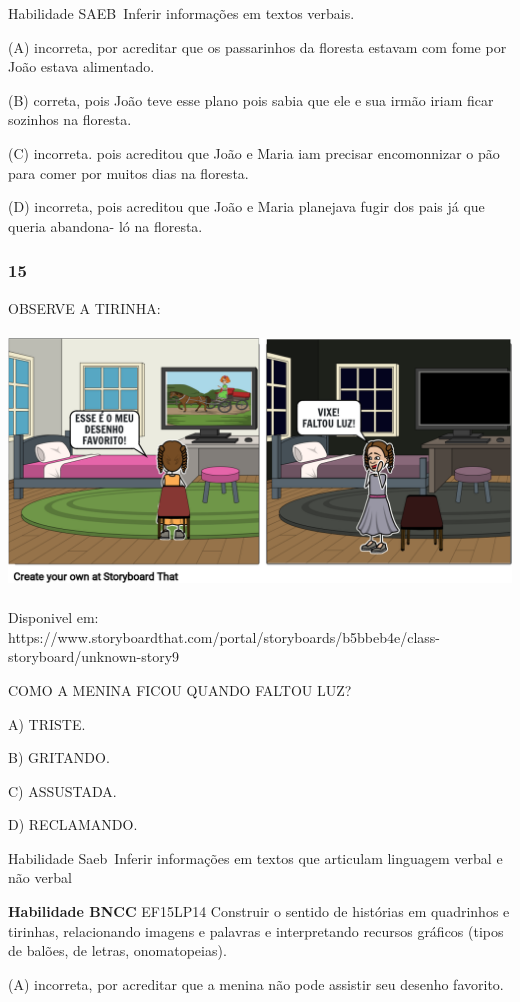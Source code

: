 \begin{escola}
Habilidade SAEB~Inferir informações em textos verbais.

(A) incorreta, por acreditar que os passarinhos da floresta estavam com
fome por João estava alimentado.

(B) correta, pois João teve esse plano pois sabia que ele e sua irmão
iriam ficar sozinhos na floresta.

(C) incorreta. pois acreditou que João e Maria iam precisar encomonnizar
o pão para comer por muitos dias na floresta.

(D) incorreta, pois acreditou que João e Maria planejava fugir dos pais
já que queria abandona- ló na floresta.

\subsubsection{15}\label{section-40}

OBSERVE A TIRINHA:

\includegraphics[width=5.42742in,height=2.68116in]{media/image206.png}

Disponivel em:
https://www.storyboardthat.com/portal/storyboards/b5bbeb4e/class-storyboard/unknown-story9

COMO A MENINA FICOU QUANDO FALTOU LUZ?

A) TRISTE.

B) GRITANDO.

C) ASSUSTADA.

D) RECLAMANDO.

Habilidade Saeb~Inferir informações em textos que articulam linguagem
verbal e não verbal

\textbf{Habilidade BNCC} EF15LP14 Construir o sentido de histórias em
quadrinhos e tirinhas, relacionando imagens e palavras e interpretando
recursos gráficos (tipos de balões, de letras, onomatopeias).

(A) incorreta, por acreditar que a menina não pode assistir seu desenho
favorito.


\end{escola}
